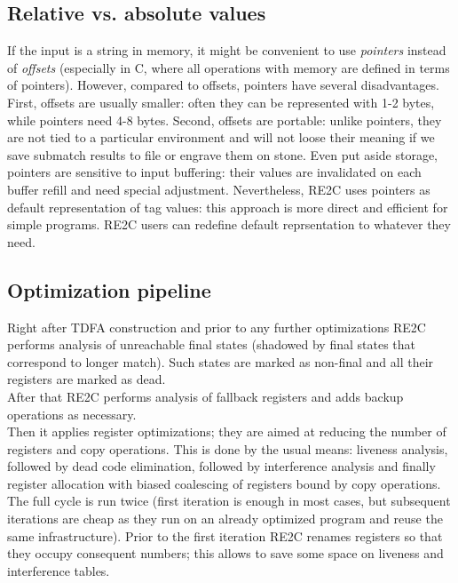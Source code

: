 \documentclass{article}
\theoremstyle{definition}
\begin{document}
\begin{multicols}{2}
\subsection*{Relative vs. absolute values}

If the input is a string in memory, it might be convenient to use \emph{pointers} instead of \emph{offsets}
(especially in C, where all operations with memory are defined in terms of pointers).
However, compared to offsets, pointers have several disadvantages.
First, offsets are usually smaller: often they can be represented with 1-2 bytes, while pointers need 4-8 bytes.
Second, offsets are portable: unlike pointers, they are not tied to a particular environment
and will not loose their meaning if we save submatch results to file or engrave them on stone.
Even put aside storage, pointers are sensitive to input buffering:
their values are invalidated on each buffer refill and need special adjustment.
Nevertheless, RE2C uses pointers as default representation of tag values:
this approach is more direct and efficient for simple programs.
RE2C users can redefine default reprsentation to whatever they need.

\subsection*{Optimization pipeline}

Right after TDFA construction and prior to any further optimizations
RE2C performs analysis of unreachable final states
(shadowed by final states that correspond to longer match).
Such states are marked as non-final and all their registers are marked as dead.
\\

After that RE2C performs analysis of fallback registers and adds backup operations as necessary.
\\

Then it applies register optimizations;
they are aimed at reducing the number of registers and copy operations.
This is done by the usual means:
liveness analysis, followed by dead code elimination,
followed by interference analysis and finally register allocation
with biased coalescing of registers bound by copy operations.
The full cycle is run twice (first iteration is enough in most cases,
but subsequent iterations are cheap as they run on an already optimized program and reuse the same infrastructure).
Prior to the first iteration RE2C renames registers so that they occupy consequent numbers;
this allows to save some space on liveness and interference tables.
\\


\end{multicols}
\end{document}
